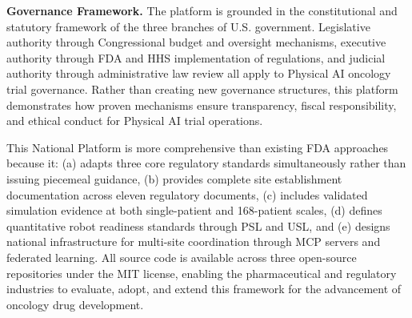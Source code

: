 \vspace{0.3cm}

\noindent\textbf{Governance Framework.}
The platform is grounded in the constitutional and statutory framework of the
three branches of U.S. government. Legislative authority through Congressional
budget and oversight mechanisms, executive authority through FDA and HHS
implementation of regulations, and judicial authority through administrative law
review all apply to Physical AI oncology trial governance. Rather than creating
new governance structures, this platform demonstrates how proven mechanisms
ensure transparency, fiscal responsibility, and ethical conduct for Physical AI
trial operations.

\vspace{0.3cm}

This National Platform is more comprehensive than existing FDA approaches
because it: (a) adapts three core regulatory standards simultaneously rather
than issuing piecemeal guidance, (b) provides complete site establishment
documentation across eleven regulatory documents, (c) includes validated
simulation evidence at both single-patient and 168-patient scales, (d) defines
quantitative robot readiness standards through PSL and USL, and (e) designs
national infrastructure for multi-site coordination through MCP servers and
federated learning. All source code is available across three open-source
repositories \cite{main-repo, mcp-repo, fl-repo} under the MIT license,
enabling the pharmaceutical and regulatory industries to evaluate, adopt, and
extend this framework for the advancement of oncology drug development.
